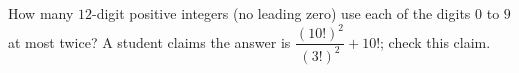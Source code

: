 How many $12$-digit positive integers (no leading zero) use each of the digits $0$ to $9$ at most twice? A student claims the answer is $\dfrac{(10!)^2}{(3!)^2}+10!$; check this claim.
